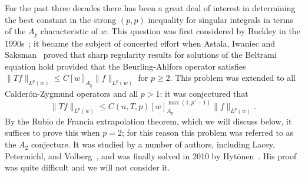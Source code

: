 \documentclass[12pt]{amsart}
\theoremstyle{definition}
\theoremstyle{remark}
\numberwithin{equation}{section}
\begin{document}
For the past three decades there has been a great deal of interest in
determining the best constant in the strong $(p,p)$ inequality for
singular integrals in terms of the $A_p$
characteristic of $w$.  This question was first considered by Buckley in the 1990s~\cite{buckley93}; it became the subject of concerted effort when Astala,
Iwaniec and Saksman~\cite{MR1815249} proved that sharp regularity
results for solutions of the Beltrami equation hold provided that the
Beurling-Ahlfors operator satisfies $\|Tf\|_{L^p(w)} \leq C
[w]_{A_p}\|f\|_{L^p(w)}$ for $p\geq 2$.  This problem was extended to
all Calder\'on-Zygmund operators and all $p>1$:  it was conjectured
that 
%
\begin{equation} \label{eqn:sharp} 
\|Tf\|_{L^p(w)} \leq C(n,T,p) [w]_{A_p}^{\max(1, p'-1)}\|f\|_{L^p(w)}.
\end{equation}
%
By the Rubio de Francia extrapolation theorem, which we will discuss
below, it suffices to prove this when $p=2$; for this reason this
problem was referred to as the $A_2$ conjecture.
 It was studied by a number of authors, including Lacey, 
Petermichl, and Volberg~\cite{lacey-petermichl-reguera2010,
 MR2354322,petermichl08, petermichl-volberg02}, and was finally solved
in 2010 by Hyt\"onen~\cite{hytonenP2010,hytonen-perez-treil-volbergP}.
His proof was quite difficult and we will not consider it. 
\end{document}
